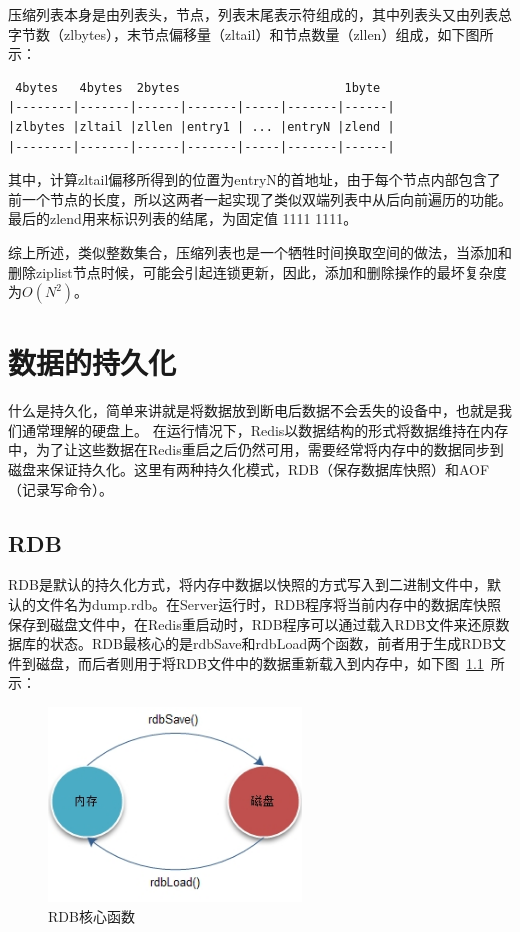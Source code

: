 \documentclass{zjutthesis}
\begin{document}
压缩列表本身是由列表头，节点，列表末尾表示符组成的，其中列表头又由列表总字节数（zlbytes），末节点偏移量（zltail）和节点数量（zllen）组成，如下图所示：
\begin{verbatim}
 4bytes   4bytes  2bytes                       1byte
|--------|-------|------|-------|-----|-------|------|
|zlbytes |zltail |zllen |entry1 | ... |entryN |zlend |
|--------|-------|------|-------|-----|-------|------|
\end{verbatim}
其中，计算zltail偏移所得到的位置为entryN的首地址，由于每个节点内部包含了前一个节点的长度，所以这两者一起实现了类似双端列表中从后向前遍历的功能。最后的zlend用来标识列表的结尾，为固定值 1111 1111。

综上所述，类似整数集合，压缩列表也是一个牺牲时间换取空间的做法，当添加和删除ziplist节点时候，可能会引起连锁更新，因此，添加和删除操作的最坏复杂度为$O(N^{2})$。


\chapter{数据的持久化}
什么是持久化，简单来讲就是将数据放到断电后数据不会丢失的设备中，也就是我们通常理解的硬盘上。
在运行情况下，Redis以数据结构的形式将数据维持在内存中，为了让这些数据在Redis重启之后仍然可用，需要经常将内存中的数据同步到磁盘来保证持久化。这里有两种持久化模式\cite{ref:19}，RDB（保存数据库快照）和AOF（记录写命令）。

\section{RDB}
RDB是默认的持久化方式，将内存中数据以快照的方式写入到二进制文件中，默认的文件名为dump.rdb。在Server运行时，RDB程序将当前内存中的数据库快照保存到磁盘文件中，在Redis重启动时，RDB程序可以通过载入RDB文件来还原数据库的状态。RDB最核心的是rdbSave和rdbLoad两个函数，前者用于生成RDB文件到磁盘，而后者则用于将RDB文件中的数据重新载入到内存中，如下图~\ref{fig:RDB}~所示：
\begin{figure}[H]
\centering
\includegraphics[width=0.6\textwidth]{RDB}
\caption{RDB核心函数}\label{fig:RDB}
\vspace{\baselineskip} %
\end{figure}
\end{document}
